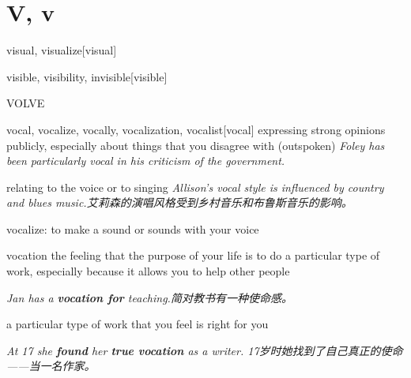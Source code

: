 \section{V, v}

\begin{DefWord}{visual, visualize}[visual]
\end{DefWord}

\begin{DefWord}{visible, visibility, invisible}[visible]
\end{DefWord}

\begin{DefWord}{VOLVE}
\end{DefWord}

\begin{DefWord}{vocal, vocalize, vocally, vocalization, vocalist}[vocal]
    expressing strong opinions publicly, especially about things that you disagree with (outspoken)
    \textit{Foley has been particularly vocal in his criticism of the government.}

    relating to the voice or to singing
    \textit{Allison’s vocal style is influenced by country and blues music.艾莉森的演唱风格受到乡村音乐和布鲁斯音乐的影响。}

    vocalize: to make a sound or sounds with your voice
\end{DefWord}

\begin{DefWord}{vocation}
    the feeling that the purpose of your life is to do a particular type of work, especially because it allows you to help other people

    \textit{Jan has a \textbf{vocation for} teaching.简对教书有一种使命感。}

    a particular type of work that you feel is right for you

    \textit{At 17 she \textbf{found} her \textbf{true vocation} as a writer. 17岁时她找到了自己真正的使命——当一名作家。}
\end{DefWord}
